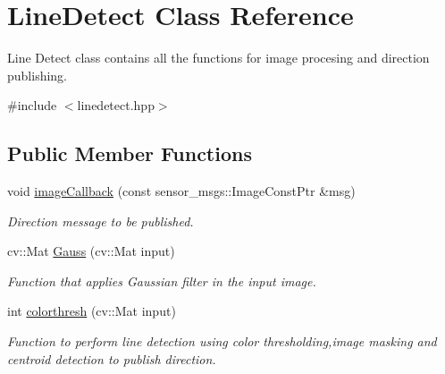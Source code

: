 \hypertarget{classLineDetect}{}\section{Line\+Detect Class Reference}
\label{classLineDetect}


Line Detect class contains all the functions for image procesing and direction publishing.  




{\ttfamily \#include $<$linedetect.\+hpp$>$}

\subsection*{Public Member Functions}
\begin{DoxyCompactItemize}
\item 
void \hyperlink{classLineDetect_a55952d3dc713611f47293aa16d9d1459}{image\+Callback} (const sensor\+\_\+msgs\+::\+Image\+Const\+Ptr \&msg)
\begin{DoxyCompactList}\small\item\em Direction message to be published. \end{DoxyCompactList}\item 
cv\+::\+Mat \hyperlink{classLineDetect_a95f915b8096799a874d5cec002f3dca3}{Gauss} (cv\+::\+Mat input)
\begin{DoxyCompactList}\small\item\em Function that applies Gaussian filter in the input image. \end{DoxyCompactList}\item 
int \hyperlink{classLineDetect_a35170d9af8b1baab0587b87475c94634}{colorthresh} (cv\+::\+Mat input)
\begin{DoxyCompactList}\small\item\em Function to perform line detection using color thresholding,image masking and centroid detection to publish direction. \end{DoxyCompactList}\end{DoxyCompactItemize}
